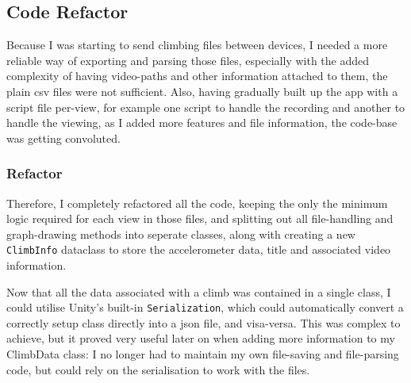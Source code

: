 \subsection{Code Refactor}
Because I was starting to send climbing files between devices, I needed a more reliable way of exporting and parsing those files, especially with the added complexity of having video-paths and other information attached to them, the plain csv files were not sufficient.
Also, having gradually built up the app with a script file per-view, for example one script to handle the recording and another to handle the viewing, as I added more features and file information, the code-base was getting convoluted.


\subsubsection{Refactor}
Therefore, I completely refactored all the code, keeping the only the minimum logic required for each view in those files, and splitting out all file-handling and graph-drawing methods into seperate classes, along with creating a new \verb|ClimbInfo| dataclass to store the accelerometer data, title and associated video information.

Now that all the data associated with a climb was contained in a single class, I could utilise Unity's built-in \verb|Serialization|, which could automatically convert a correctly setup class directly into a json file, and visa-versa. 
This was complex to achieve, but it proved very useful later on when adding more information to my ClimbData class: I no longer had to maintain my own file-saving and file-parsing code, but could rely on the serialisation to work with the files.


